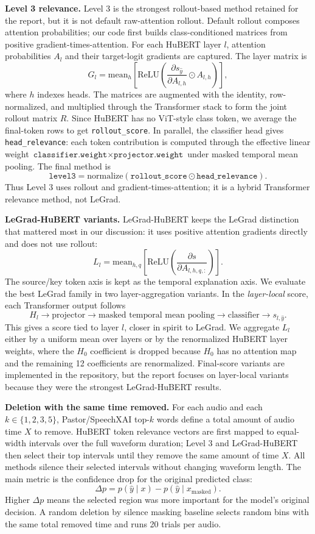 \documentclass[10pt]{article}
\begin{document}
\textbf{Level 3 relevance.} Level 3 is the strongest rollout-based method retained for the report, but it is not default raw-attention rollout. Default rollout composes attention probabilities; our code first builds class-conditioned matrices from positive gradient-times-attention. For each HuBERT layer \(l\), attention probabilities \(A_l\) and their target-logit gradients are captured. The layer matrix is
\[
G_l=\mathrm{mean}_{h}\left[\mathrm{ReLU}\left(
\frac{\partial s_{\hat{y}}}{\partial A_{l,h}}\odot A_{l,h}
\right)\right],
\]
where \(h\) indexes heads. The matrices are augmented with the identity, row-normalized, and multiplied through the Transformer stack to form the joint rollout matrix \(R\). Since HuBERT has no ViT-style class token, we average the final-token rows to get \texttt{rollout\_score}. In parallel, the classifier head gives \texttt{head\_relevance}: each token contribution is computed through the effective linear weight \(\texttt{classifier.weight}\times\texttt{projector.weight}\) under masked temporal mean pooling. The final method is
\[
\texttt{level3}=\mathrm{normalize}(\texttt{rollout\_score}\odot\texttt{head\_relevance}).
\]
Thus Level 3 uses rollout and gradient-times-attention; it is a hybrid Transformer relevance method, not LeGrad.

\textbf{LeGrad-HuBERT variants.} LeGrad-HuBERT keeps the LeGrad distinction that mattered most in our discussion: it uses positive attention gradients directly and does not use rollout:
\[
L_l=\mathrm{mean}_{h,q}\left[
\mathrm{ReLU}\left(\frac{\partial s}{\partial A_{l,h,q,:}}\right)
\right].
\]
The source/key token axis is kept as the temporal explanation axis. We evaluate the best LeGrad family in two layer-aggregation variants. In the \emph{layer-local} score, each Transformer output follows
\[
H_l \rightarrow \text{projector} \rightarrow \text{masked temporal mean pooling}
\rightarrow \text{classifier} \rightarrow s_{l,\hat{y}}.
\]
This gives a score tied to layer \(l\), closer in spirit to LeGrad. We aggregate \(L_l\) either by a uniform mean over layers or by the renormalized HuBERT layer weights, where the \(H_0\) coefficient is dropped because \(H_0\) has no attention map and the remaining 12 coefficients are renormalized. Final-score variants are implemented in the repository, but the report focuses on layer-local variants because they were the strongest LeGrad-HuBERT results.

\textbf{Deletion with the same time removed.} For each audio and each \(k\in\{1,2,3,5\}\), Pastor/SpeechXAI top-\(k\) words define a total amount of audio time \(X\) to remove. HuBERT token relevance vectors are first mapped to equal-width intervals over the full waveform duration; Level 3 and LeGrad-HuBERT then select their top intervals until they remove the same amount of time \(X\). All methods silence their selected intervals without changing waveform length. The main metric is the confidence drop for the original predicted class:
\[
\Delta p = p(\hat{y}\mid x)-p(\hat{y}\mid x_{\mathrm{masked}}).
\]
Higher \(\Delta p\) means the selected region was more important for the model's original decision. A random deletion by silence masking baseline selects random bins with the same total removed time and runs 20 trials per audio.
\end{document}
